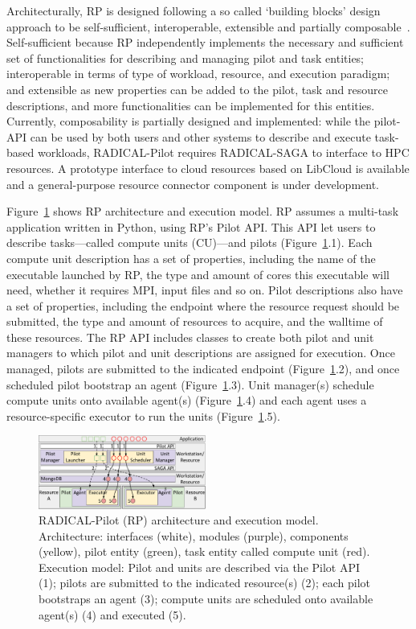 \documentclass{webofc}
\begin{document}
Architecturally, RP is designed following a so called ‘building blocks’
design approach to be self-sufficient, interoperable, extensible and
partially composable~\cite{turilli2018building}. Self-sufficient because RP
independently implements the necessary and sufficient set of functionalities
for describing and managing pilot and task entities; interoperable in terms
of type of workload, resource, and execution paradigm; and extensible as new
properties can be added to the pilot, task and resource descriptions, and
more functionalities can be implemented for this entities. Currently,
composability is partially designed and implemented: while the pilot-API can
be used by both users and other systems to describe and execute task-based
workloads, RADICAL-Pilot requires RADICAL-SAGA to interface to HPC resources.
A prototype interface to cloud resources based on LibCloud is available and a
general-purpose resource connector component is under development.
	
Figure~\ref{fig:rp-arch} shows RP architecture and execution model. RP
assumes a multi-task application written in Python, using RP's Pilot API.
This API let users to describe tasks---called compute units (CU)---and pilots
(Figure~\ref{fig:rp-arch}.1). Each compute unit description has a set of
properties, including the name of the executable launched by RP, the type and
amount of cores this executable will need, whether it requires MPI, input
files and so on. Pilot descriptions also have a set of properties, including
the endpoint where the resource request should be submitted, the type and
amount of resources to acquire, and the walltime of these resources. The RP
API includes classes to create both pilot and unit managers to which pilot
and unit descriptions are assigned for execution. Once managed, pilots are
submitted to the indicated endpoint (Figure~\ref{fig:rp-arch}.2), and once
scheduled pilot bootstrap an agent (Figure~\ref{fig:rp-arch}.3). Unit
manager(s) schedule compute units onto available agent(s)
(Figure~\ref{fig:rp-arch}.4) and each agent uses a resource-specific executor
to run the units (Figure~\ref{fig:rp-arch}.5).

\begin{figure}
  \centering
  \includegraphics[width=0.49\textwidth]{figures/rp_arch.pdf}
  \caption{RADICAL-Pilot (RP) architecture and execution model.
           Architecture: interfaces (white), modules (purple), components
           (yellow), pilot entity (green), task entity called compute unit
           (red). Execution model: Pilot and units are described via the
           Pilot API (1); pilots are submitted to the indicated resource(s)
           (2); each pilot bootstraps an agent (3); compute units are
           scheduled onto available agent(s) (4) and executed
           (5).}\label{fig:rp-arch}
\end{figure}
	
\end{document}
